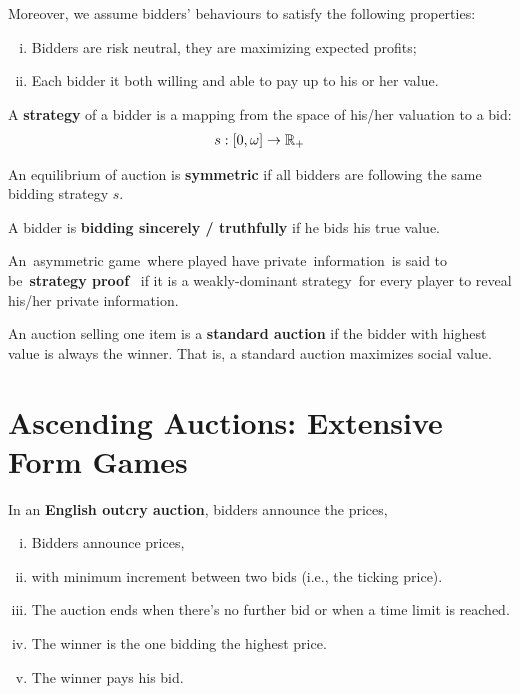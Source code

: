 \documentclass{article}
\begin{document}
	\begin{assumption}
		Moreover, we assume bidders' behaviours to satisfy the following properties:
		\begin{enumerate}[(i)]
			\item Bidders are risk neutral, they are maximizing expected profits;
			\item Each bidder it both willing and able to pay up to his or her value.
		\end{enumerate}
	\end{assumption}
	
	\begin{definition}
		A \textbf{strategy} of a bidder is a mapping from the space of his/her valuation to a bid:
		\begin{align}
			s: [0, \omega] \to \mathbb{R}_+
		\end{align}
	\end{definition}
	
	\begin{definition}
		An equilibrium of auction is \textbf{symmetric} if all bidders are following the same bidding strategy $s$.
	\end{definition}
	
	\begin{definition}
		A bidder is \textbf{bidding sincerely / truthfully} if he bids his true value. 
	\end{definition}

	\begin{definition}
		An asymmetric game where played have private information is said to be \textbf{strategy proof}  if it is a weakly-dominant strategy for every player to reveal his/her private information.
	\end{definition}

	\begin{definition}
		An auction selling one item is a \textbf{standard auction} if the bidder with highest value is always the winner. That is, a standard auction maximizes social value.
	\end{definition}

	\section{Ascending Auctions: Extensive Form Games}
	
	\begin{definition}
		In an \textbf{English outcry auction}, bidders announce the prices,
		\begin{enumerate}[(i)]
			\item Bidders announce prices,
			\item with minimum increment between two bids (i.e., the ticking price).
			\item The auction ends when there's no further bid or when a time limit is reached.
			\item The winner is the one bidding the highest price.
			\item The winner pays his bid.
		\end{enumerate}
	\end{definition}
	
\end{document}
